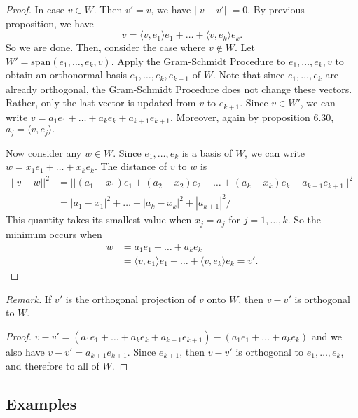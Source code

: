 \documentclass[11pt]{article}
\begin{document}
    \begin{proof}
        In case \(v \in W\). Then \(v' = v\), we have \(|| v - v' || = 0\). By previous proposition, we have \[v = \langle v, e_1 \rangle e_1 + \dots + \langle v, e_k \rangle e_k.\] So we are done. Then, consider the case where \(v \notin W\). Let \(W' = \text{span}(e_1, \dots, e_k, v).\) Apply the Gram-Schmidt Procedure to \(e_1, \dots, e_k, v\) to obtain an orthonormal basis \(e_1, \dots, e_k, e_{k+1}\) of $W$. Note that since \(e_1, \dots, e_k\) are already orthogonal, the Gram-Schmidt Procedure does not change these vectors. Rather, only the last vector is updated from $v$ to \(e_{k+1}\). Since \(v \in W'\), we can write \(v = a_1 e_1 + \dots + a_k e_k + a_{k+1} e_{k+1}\). Moreover, again by proposition 6.30, \(a_j = \langle v, e_j \rangle.\) 
        
        Now consider any \(w \in W\). Since \(e_1, \dots, e_k\) is a basis of $W$, we can write \(w = x_1 e_1 + \dots + x_k e_k\). The distance of $v$ to $w$ is
        \begin{align*}
            ||v-w||^2 &= ||(a_1 - x_1)e_1 + (a_2 - x_2)e_2 + \dots + (a_k - x_k) e_k + a_{k+1} e_{k+1}||^2 \\
                      &= |a_1 - x_1|^2 + \dots + |a_k - x_k|^2 + |a_{k+1}|^2/
        \end{align*}
        This quantity takes its smallest value when \(x_j = a_j\) for \(j = 1, \dots, k\). So the minimum occurs when 
        \begin{align*}
            w &= a_1 e_1 + \dots + a_k e_k \\
              &= \langle v, e_1 \rangle e_1 + \dots + \langle v, e_k \rangle e_k = v'.
        \end{align*}
    \end{proof}

    \emph{Remark.} If $v'$ is the orthogonal projection of $v$ onto $W$, then \(v-v'\) is orthogonal to $W$.

    \begin{proof}
        \(v - v' = (a_1 e_1 + \dots + a_k e_k + a_{k+1} e_{k+1}) - (a_1 e_1 + \dots + a_k e_k)\) and we also have \(v - v' = a_{k+1} e_{k+1}\). Since \(e_{k+1}\), then \(v-v'\) is orthogonal to \(e_1, \dots, e_k\), and therefore to all of $W$.
    \end{proof}

    \subsection{Examples}
\end{document}

